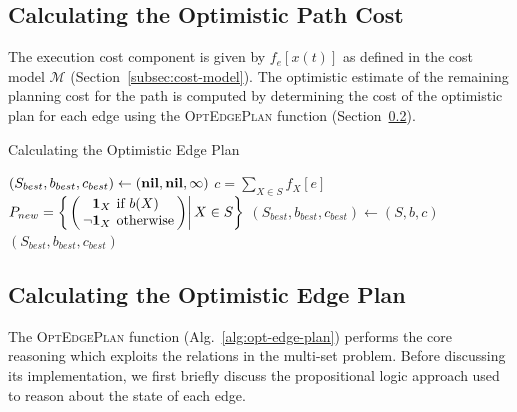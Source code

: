 \subsection{Calculating the Optimistic Path Cost}
\label{subsec:alg-opt-path-cost}

The execution cost component is given by $f_e[x(t)]$
as defined in the cost model $\mathcal{M}$
(Section~\ref{subsec:cost-model}).
The optimistic estimate of the remaining planning cost for the path
is computed by determining the cost of the optimistic plan for each
edge using the \textsc{OptEdgePlan} function
(Section~\ref{subsec:alg-opt-edge-plan}).

\begin{algorithm}
\caption{Calculating the Optimistic Edge Plan}
\label{alg:opt-edge-plan}
\begin{algorithmic}[1]
   \State $(S_{best}, b_{best}, c_{best})
      \leftarrow (\mbox{\textbf{nil}}, \mbox{\textbf{nil}}, \infty)$
         \label{line:power-set}
      \State $c = \sum_{X \in S} f_X[e]$
            \label{line:all-binary-functions}
         \State $\arraycolsep=2pt
            P_{new} =
            \left\{\left.\left( \begin{array}{rl}
            \mathbf{1}_X & \mbox{if } b(X) \\
            \lnot \mathbf{1}_X & \mbox{otherwise} \\
            \end{array} \right)
            \right|
            X \in S
            \right\}$
               \State $(S_{best}, b_{best}, c_{best})
                  \leftarrow (S, b, c)$
            \EndIf
         \EndIf
      \EndFor
   \EndFor
   \State \Return $(S_{best}, b_{best}, c_{best})$
\EndFunction
\end{algorithmic}
\end{algorithm}

\subsection{Calculating the Optimistic Edge Plan}
\label{subsec:alg-opt-edge-plan}

The \textsc{OptEdgePlan} function (Alg.~\ref{alg:opt-edge-plan})
performs the core reasoning which exploits the relations in
the multi-set problem.
Before discussing its implementation,
we first briefly discuss the propositional logic approach
used to reason about the state of each edge.

